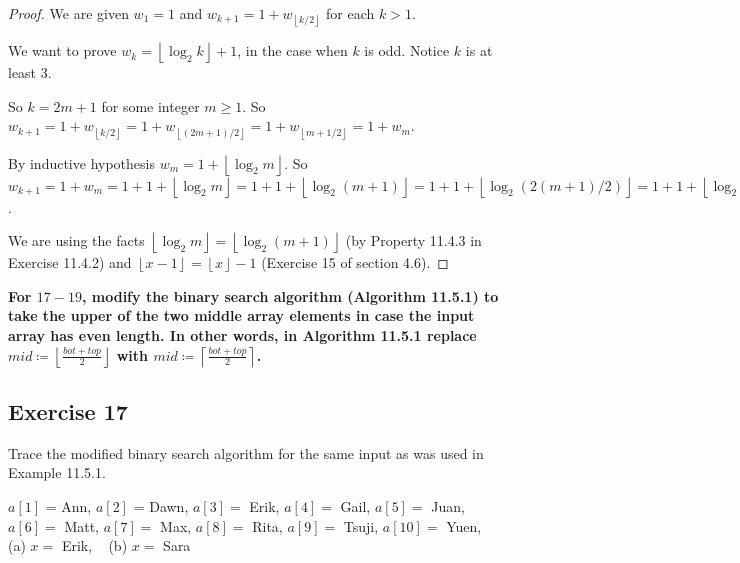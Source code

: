 \documentclass[14pt]{extarticle}
\newcommand{\dps}{\displaystyle}
\newcommand{\cy}{\color{cyan}}
\newcommand{\floor}[1]{{\left\lfloor#1\right\rfloor}}
\newcommand{\ceil}[1]{{\left\lceil#1\right\rceil}}
\begin{document}
\begin{proof}
    We are given \(w_1 = 1\) and \(w_{k+1} = 1 + w_{\floor{k/2}}\) for each \(k > 1\).

    We want to prove \(w_k = \floor{\log_2 k} + 1\), in the case when \(k\) is odd. Notice \(k\) is at least 3.

    So \(k = 2m+1\) for some integer \(m \geq 1\). So \(w_{k+1} = 1 + w_{\floor{k/2}} = 1 + w_{\floor{(2m+1)/2}} = 1 +
    w_{\floor{m + 1/2}} = 1 + w_m\).

    By inductive hypothesis \(w_m = 1 + \floor{\log_2 m}\). So \(w_{k+1} = 1 + w_m = 1 + 1 + \floor{\log_2 m} = 1 + 1 +
    \floor{\log_2 (m+1)} = 1 + 1 + \floor{\log_2 (2(m+1)/2)} = 1 + 1 + \floor{\log_2 (2(m+1)) - \log_2 2} = 1 + 1 + \floor{\log_2
        (2(m+1)) - 1} = 1 + 1 + (\floor{\log_2 (2(m+1))} - 1) = 1 + \floor{\log_2 (2m+2)} = 1 + \floor{\log_2 (k+1)}\).

    We are using the facts \(\floor{\log_2 m} = \floor{\log_2 (m+1)}\) (by Property 11.4.3 in Exercise 11.4.2) and
    \(\floor{x-1} = \floor{x} - 1\) (Exercise 15 of section 4.6).
\end{proof}

{\bf \cy For \(17-19\), modify the binary search algorithm (Algorithm 11.5.1) to take the upper of the two middle array
elements in case the input array has even length. In other words, in Algorithm 11.5.1 replace \(\dps mid \coloneqq \floor{\frac{bot+top}{2}}\) with \(\dps mid \coloneqq
\ceil{\frac{bot+top}{2}}\).}

\subsection{Exercise 17}
Trace the modified binary search algorithm for the same input as was used in Example 11.5.1.

\(a[1]\) = Ann, \(a[2]\) = Dawn, \(a[3] =\) Erik, \(a[4] =\) Gail, \(a[5] =\) Juan, \(a[6] =\) Matt, \(a[7] =\) Max,
\(a[8] =\) Rita, \(a[9] =\) Tsuji, \(a[10] =\) Yuen, \,\,\,
(a) \(x = \) Erik, \,\,\, (b) \(x = \) Sara
\end{document}
